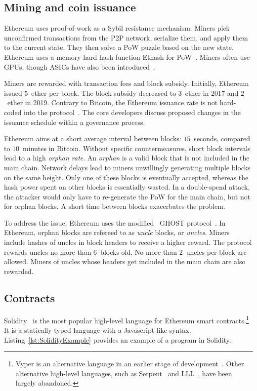 \subsection{Mining and coin issuance}

Ethereum uses proof-of-work as a Sybil resistance mechanism.
Miners pick unconfirmed transactions from the P2P network, serialize them, and apply them to the current state.
They then solve a PoW puzzle based on the new state.
Ethereum uses a memory-hard hash function Ethash for PoW~\cite{Ethash}.
Miners often use GPUs, though ASICs have also been introduced~\cite{OLeary2018}.

Miners are rewarded with transaction fees and block subsidy.
Initially, Ethereum issued $5$~ether per block.
The block subsidy decreased to $3$~ether in 2017 and $2$~ether in 2019.
Contrary to Bitcoin, the Ethereum issuance rate is not hard-coded into the protocol~\cite{Ethhub2020}.
The core developers discuss proposed changes in the issuance schedule within a governance process.

Ethereum aims at a short average interval between blocks: $15$~seconds, compared to $10$~minutes in Bitcoin.
Without specific countermeasures, short block intervals lead to a high \textit{orphan rate}.
An \textit{orphan} is a valid block that is not included in the main chain.
Network delays lead to miners unwillingly generating multiple blocks on the same height.
Only one of these blocks is eventually accepted, whereas the hash power spent on other blocks is essentially wasted.
In a double-spend attack, the attacker would only have to re-generate the PoW for the main chain, but not for orphan blocks.
A short time between blocks exacerbates the problem.

To address the issue, Ethereum uses the modified~\cite{Lewenberg2015} GHOST protocol~\cite{Sompolinsky2013, EthdocsMining}.
In Ethereum, orphan blocks are refereed to as \textit{uncle} blocks, or \textit{uncles}.
Miners include hashes of uncles in block headers to receive a higher reward.
The protocol rewards uncles no more than $6$~blocks old.
No more than $2$~uncles per block are allowed.
Miners of uncles whose headers get included in the main chain are also rewarded.


\subsection{Contracts}

Solidity~\cite{Solidity17} is the most popular high-level language for Ethereum smart contracts.\footnote{Vyper is an alternative language in an earlier stage of development~\cite{Vyper}. Other alternative high-level languages, such as Serpent~\cite{SerpentGithub} and LLL~\cite{Ellison2017}, have been largely abandoned.}
It is a statically typed language with a Javascript-like syntax.
Listing~\ref{lst:SolidityExample} provides an example of a program in Solidity.

